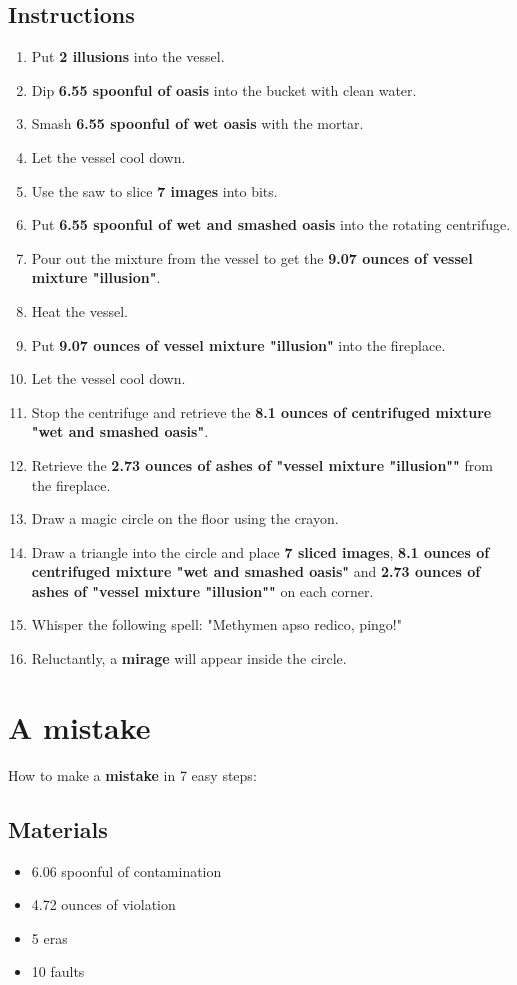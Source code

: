 \documentclass{article}
\begin{document}
\subsection{Instructions}\begin{enumerate}
\item 
Put \textbf{2 illusions} into the vessel.
\item 
Dip \textbf{6.55 spoonful of oasis} into the bucket with clean water.
\item 
Smash \textbf{6.55 spoonful of wet oasis} with the mortar.
\item 
Let the vessel cool down.
\item 
Use the saw to slice \textbf{7 images} into bits.
\item 
Put \textbf{6.55 spoonful of wet and smashed oasis} into the rotating centrifuge.
\item 
Pour out the mixture from the vessel to get the \textbf{9.07 ounces of vessel mixture "illusion"}.
\item 
Heat the vessel.
\item 
Put \textbf{9.07 ounces of vessel mixture "illusion"} into the fireplace.
\item 
Let the vessel cool down.
\item 
Stop the centrifuge and retrieve the \textbf{8.1 ounces of centrifuged mixture "wet and smashed oasis"}.
\item 
Retrieve the \textbf{2.73 ounces of ashes of "vessel mixture "illusion""} from the fireplace.
\item 
Draw a magic circle on the floor using the crayon.
\item 
Draw a triangle into the circle and place \textbf{7 sliced images}, \textbf{8.1 ounces of centrifuged mixture "wet and smashed oasis"} and \textbf{2.73 ounces of ashes of "vessel mixture "illusion""} on each corner.
\item 
Whisper the following spell: "Methymen apso redico, pingo!"
\item 
Reluctantly, a \textbf{mirage} will appear inside the circle.
\end{enumerate}
\newpage
\section{A mistake}How to make a \textbf{mistake} in 7 easy steps:

\subsection{Materials}\begin{itemize}
\item 
6.06 spoonful of contamination
\item 
4.72 ounces of violation
\item 
5 eras
\item 
10 faults
\end{itemize}
\end{document}
